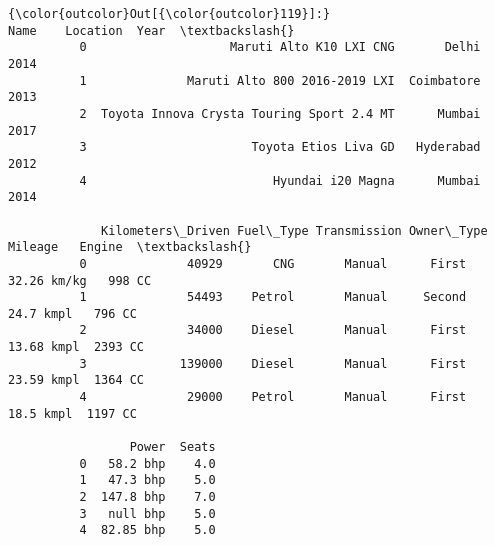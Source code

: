 \documentclass[11pt]{article}
\begin{document}
\begin{Verbatim}[commandchars=\\\{\}]
{\color{outcolor}Out[{\color{outcolor}119}]:}                                         Name    Location  Year  \textbackslash{}
          0                    Maruti Alto K10 LXI CNG       Delhi  2014   
          1              Maruti Alto 800 2016-2019 LXI  Coimbatore  2013   
          2  Toyota Innova Crysta Touring Sport 2.4 MT      Mumbai  2017   
          3                       Toyota Etios Liva GD   Hyderabad  2012   
          4                          Hyundai i20 Magna      Mumbai  2014   
          
             Kilometers\_Driven Fuel\_Type Transmission Owner\_Type      Mileage   Engine  \textbackslash{}
          0              40929       CNG       Manual      First  32.26 km/kg   998 CC   
          1              54493    Petrol       Manual     Second    24.7 kmpl   796 CC   
          2              34000    Diesel       Manual      First   13.68 kmpl  2393 CC   
          3             139000    Diesel       Manual      First   23.59 kmpl  1364 CC   
          4              29000    Petrol       Manual      First    18.5 kmpl  1197 CC   
          
                 Power  Seats  
          0   58.2 bhp    4.0  
          1   47.3 bhp    5.0  
          2  147.8 bhp    7.0  
          3   null bhp    5.0  
          4  82.85 bhp    5.0  
\end{Verbatim}
            

    
    
    
    
\end{document}
